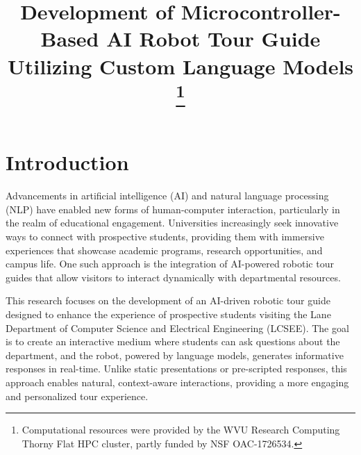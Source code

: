\documentclass[conference]{IEEEtran}
\begin{document}
\title{Development of Microcontroller-Based AI Robot Tour Guide Utilizing Custom Language Models
\thanks{Computational resources were provided by the WVU Research Computing Thorny Flat HPC cluster, partly funded by NSF OAC-1726534.}
}

\author{
    \and
}

\maketitle
\thispagestyle{plain}
\pagestyle{plain}

\begin{abstract}
    
\end{abstract}


\section{Introduction}
Advancements in artificial intelligence (AI) and natural language processing (NLP) have enabled new forms of human-computer interaction, particularly in the realm of educational engagement. 
Universities increasingly seek innovative ways to connect with prospective students, providing them with immersive experiences that showcase academic programs, research opportunities, and campus life. 
One such approach is the integration of AI-powered robotic tour guides that allow visitors to interact dynamically with departmental resources.

This research focuses on the development of an AI-driven robotic tour guide designed to enhance the experience of prospective students visiting the Lane Department of Computer Science and Electrical Engineering (LCSEE). 
The goal is to create an interactive medium where students can ask questions about the department, and the robot, powered by language models, generates informative responses in real-time. 
Unlike static presentations or pre-scripted responses, this approach enables natural, context-aware interactions, providing a more engaging and personalized tour experience.
\end{document}
